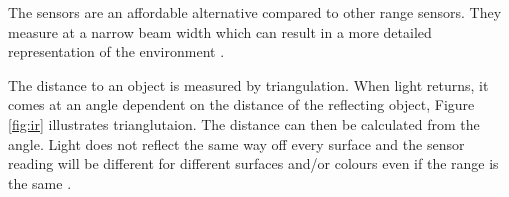 The sensors are an affordable alternative compared to other range sensors. They measure at a narrow beam width which can result in a more detailed representation of the environment \cite{infrared}.

The distance to an object is measured by triangulation. When light returns, it comes at an angle dependent on the distance of the reflecting object, Figure \ref{fig:ir} illustrates trianglutaion. The distance can then be calculated from the angle. Light does not reflect the same way off every surface and the sensor reading will be different for different surfaces and/or colours even if the range is the same \cite{infrared}.

\newpage